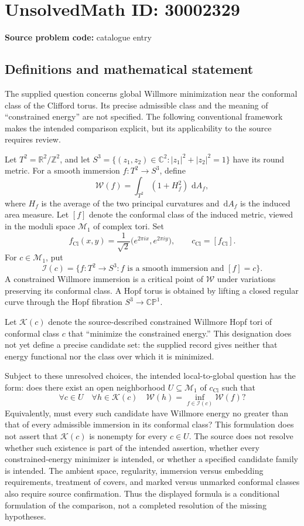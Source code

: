 \documentclass[11pt]{article}
\newcommand{\Z}{\mathbb{Z}}
\newcommand{\R}{\mathbb{R}}
\newcommand{\C}{\mathbb{C}}
\newcommand{\dd}{\,\mathrm{d}}
\begin{document}
\section*{UnsolvedMath ID: 30002329}
\textbf{Source problem code:} catalogue entry
\subsection{Definitions and mathematical statement}
The supplied question concerns global Willmore minimization near the conformal class of the Clifford torus. Its precise admissible class and the meaning of ``constrained energy'' are not specified. The following conventional framework makes the intended comparison explicit, but its applicability to the source requires review.

Let \(T^2=\R^2/\Z^2\), and let \(S^3=\{(z_1,z_2)\in\C^2:|z_1|^2+|z_2|^2=1\}\) have its round metric. For a smooth immersion \(f:T^2\to S^3\), define
\[
\mathcal W(f)=\int_{T^2}(1+H_f^2)\,\dd A_f,
\]
where \(H_f\) is the average of the two principal curvatures and \(\dd A_f\) is the induced area measure. Let \([f]\) denote the conformal class of the induced metric, viewed in the moduli space \(\mathcal M_1\) of complex tori. Set
\[
f_{\mathrm{Cl}}(x,y)=\frac{1}{\sqrt2}\bigl(e^{2\pi i x},e^{2\pi i y}\bigr),
\qquad c_{\mathrm{Cl}}=[f_{\mathrm{Cl}}].
\]
For \(c\in\mathcal M_1\), put
\[
\mathcal I(c)=\{f:T^2\to S^3: f\text{ is a smooth immersion and }[f]=c\}.
\]
A constrained Willmore immersion is a critical point of \(\mathcal W\) under variations preserving its conformal class. A Hopf torus is obtained by lifting a closed regular curve through the Hopf fibration \(S^3\to\mathbb{CP}^1\).

Let \(\mathcal K(c)\) denote the source-described constrained Willmore Hopf tori of conformal class \(c\) that ``minimize the constrained energy.'' This designation does not yet define a precise candidate set: the supplied record gives neither that energy functional nor the class over which it is minimized.

Subject to these unresolved choices, the intended local-to-global question has the form: does there exist an open neighborhood \(U\subseteq\mathcal M_1\) of \(c_{\mathrm{Cl}}\) such that
\[
\forall c\in U\quad\forall h\in\mathcal K(c)\quad
\mathcal W(h)=\inf_{f\in\mathcal I(c)}\mathcal W(f)?
\]
Equivalently, must every such candidate have Willmore energy no greater than that of every admissible immersion in its conformal class? This formulation does not assert that \(\mathcal K(c)\) is nonempty for every \(c\in U\). The source does not resolve whether such existence is part of the intended assertion, whether every constrained-energy minimizer is intended, or whether a specified candidate family is intended. The ambient space, regularity, immersion versus embedding requirements, treatment of covers, and marked versus unmarked conformal classes also require source confirmation. Thus the displayed formula is a conditional formulation of the comparison, not a completed resolution of the missing hypotheses.
\end{document}
